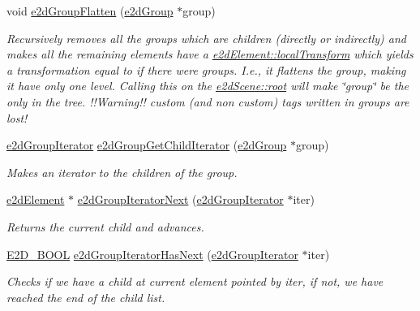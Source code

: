 \begin{DoxyCompactItemize}
void \hyperlink{group__e2dGroup_gafa65ab615b8a0c181a2d5b88eed9fa16}{e2d\-Group\-Flatten} (\hyperlink{structe2dGroup}{e2d\-Group} $\ast$group)
\begin{DoxyCompactList}\small\item\em Recursively removes all the groups which are children (directly or indirectly) and makes all the remaining elements have a \hyperlink{structe2dElement_a52bda732df714953f93c1e6f5f7c7c93}{e2d\-Element\-::local\-Transform} which yields a transformation equal to if there were groups. I.\-e., it flattens the group, making it have only one level. Calling this on the \hyperlink{structe2dScene_aa5444ac46bf18449921a4094bcadde1c}{e2d\-Scene\-::root} will make \char`\"{}group\char`\"{} be the only in the tree. !!\-Warning!! custom (and non custom) tags written in groups are lost! \end{DoxyCompactList}\item 
\hyperlink{structe2dGroupIterator}{e2d\-Group\-Iterator} \hyperlink{group__e2dGroup_gaf5a7338c446192338b764a7ac89371d5}{e2d\-Group\-Get\-Child\-Iterator} (\hyperlink{structe2dGroup}{e2d\-Group} $\ast$group)
\begin{DoxyCompactList}\small\item\em Makes an iterator to the children of the group. \end{DoxyCompactList}\item 
\hyperlink{structe2dElement}{e2d\-Element} $\ast$ \hyperlink{group__e2dGroup_gaa5ffe3eb2b83f318df4f22272f1e1189}{e2d\-Group\-Iterator\-Next} (\hyperlink{structe2dGroupIterator}{e2d\-Group\-Iterator} $\ast$iter)
\begin{DoxyCompactList}\small\item\em Returns the current child and advances. \end{DoxyCompactList}\item 
\hyperlink{Ez2DS_8h_aac8cdc3a3bcd6b56a8c3e0bb6979cbf8}{E2\-D\-\_\-\-B\-O\-O\-L} \hyperlink{group__e2dGroup_ga493d54c28198410762cfa32c97d8e646}{e2d\-Group\-Iterator\-Has\-Next} (\hyperlink{structe2dGroupIterator}{e2d\-Group\-Iterator} $\ast$iter)
\begin{DoxyCompactList}\small\item\em Checks if we have a child at current element pointed by iter, if not, we have reached the end of the child list. \end{DoxyCompactList}\end{DoxyCompactItemize}


